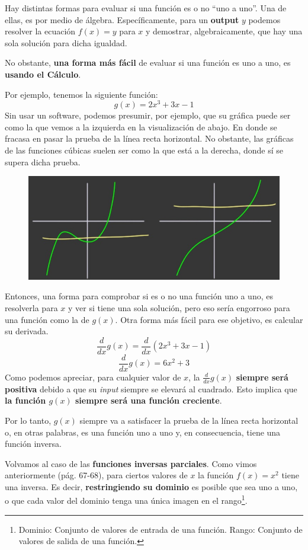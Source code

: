 \documentclass[12pt]{article}
\begin{document}
Hay distintas formas para evaluar si una función es o no ``uno a uno''. Una de ellas, es por medio de álgebra. Específicamente, para un \textbf{output} $y$ podemos resolver la ecuación $f(x) = y$ para $x$ y demostrar, algebraicamente, que hay una sola solución para dicha igualdad.

No obstante, \textbf{una forma más fácil} de evaluar si una función es uno a uno, es \textbf{usando el Cálculo}.

Por ejemplo, tenemos la siguiente función:
\[g(x) = 2x^{3} + 3x - 1\]
Sin usar un software, podemos presumir, por ejemplo, que su gráfica puede ser como la que vemos a la izquierda en la visualización de abajo. En donde se fracasa en pasar la prueba de la línea recta horizontal. No obstante, las gráficas de las funciones cúbicas suelen ser como la que está a la derecha, donde sí se supera dicha prueba.

\begin{figure}[hbt!]
\centering
\includegraphics[scale=0.5]{img/cubic_one_to_one.jpg}
\end{figure}

Entonces, una forma para comprobar si es o no una función uno a uno, es resolverla para $x$ y ver si tiene una sola solución, pero eso sería engorroso para una función como la de $g(x)$. Otra forma más fácil para ese objetivo, es calcular su derivada.
\[\frac{d}{dx} g(x) = \frac{d}{dx}(2x^{3} + 3x - 1)\]
\[\frac{d}{dx} g(x) = 6x^{2} + 3\]
Como podemos apreciar, para cualquier valor de $x$, la $\frac{d}{dx} g(x)$ \textbf{siempre será positiva} debido a que su \textit{input} siempre se elevará al cuadrado. Esto implica que \textbf{la función $g(x)$ siempre será una función creciente}.

Por lo tanto, $g(x)$ siempre va a satisfacer la prueba de la línea recta horizontal o, en otras palabras, es una función uno a uno y, en consecuencia, tiene una función inversa.

\newpage

Volvamos al caso de las \textbf{funciones inversas parciales}. Como vimos anteriormente (pág. 67-68), para ciertos valores de $x$ la función $f(x) = x^{2}$ tiene una inversa. Es decir, \textbf{restringiendo su dominio} es posible que sea uno a uno, o que cada valor del dominio tenga una única imagen en el rango\footnote{Dominio: Conjunto de valores de entrada de una función. Rango: Conjunto de valores de salida de una función.}.
\end{document}
